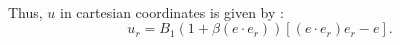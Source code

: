 \documentclass[options]{article}
\begin{document}
\begin{align*}
\end{align*}

\vspace{0.5 cm}
Thus, $u$ in cartesian coordinates is given by :
\begin{equation*}
\boxed{u_r = B_1(1+\beta (e\cdot e_r)) [(e\cdot e_r)e_r - e].}
\end{equation*}

\nocite{*}


\end{document}
